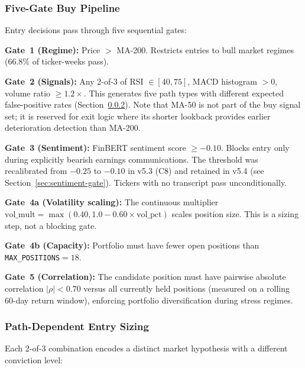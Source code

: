 \documentclass[11pt,twoside,a4paper]{article}
\begin{document}
\subsubsection{Five-Gate Buy Pipeline}

Entry decisions pass through five sequential gates:

\textbf{Gate~1 (Regime):} Price $>$ MA-200. Restricts entries to bull market regimes (66.8\% of ticker-weeks pass).

\textbf{Gate~2 (Signals):} Any 2-of-3 of RSI $\in [40, 75]$, MACD histogram $> 0$, volume ratio $\geq 1.2\times$. This generates five path types with different expected false-positive rates (Section~\ref{sec:path-sizing}). Note that MA-50 is not part of the buy signal set; it is reserved for exit logic where its shorter lookback provides earlier deterioration detection than MA-200.

\textbf{Gate~3 (Sentiment):} FinBERT sentiment score $\geq -0.10$. Blocks entry only during explicitly bearish earnings communications. The threshold was recalibrated from $-0.25$ to $-0.10$ in v5.3 (C8) and retained in v5.4 (see Section~\ref{sec:sentiment-gate}). Tickers with no transcript pass unconditionally.

\textbf{Gate~4a (Volatility scaling):} The continuous multiplier $\text{vol\_mult} = \max(0.40, 1.0 - 0.60 \times \text{vol\_pct})$ scales position size. This is a sizing step, not a blocking gate.

\textbf{Gate~4b (Capacity):} Portfolio must have fewer open positions than \texttt{MAX\_POSITIONS}$=18$.

\textbf{Gate~5 (Correlation):} The candidate position must have pairwise absolute correlation $|\rho| < 0.70$ versus all currently held positions (measured on a rolling 60-day return window), enforcing portfolio diversification during stress regimes.

\subsubsection{Path-Dependent Entry Sizing}
\label{sec:path-sizing}

Each 2-of-3 combination encodes a distinct market hypothesis with a different conviction level:
\end{document}

